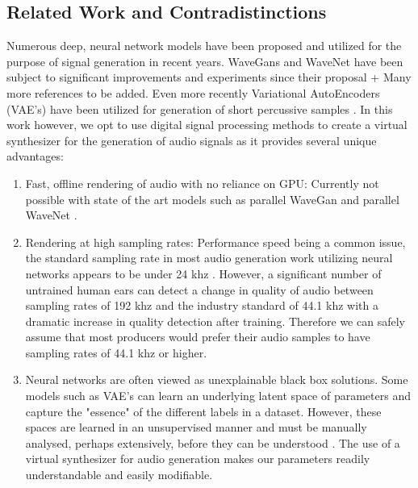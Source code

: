 \documentclass{nime-alternate} %
\begin{document}
\subsection{Related Work and Contradistinctions}
\label{related}
Numerous deep, neural network models have been proposed and utilized for the purpose of signal generation in recent years. WaveGans and WaveNet have been subject to significant improvements and experiments since their proposal \colorbox{green!=40}{\cite{nsynth2017} + Many more references to be added.} Even more recently Variational AutoEncoders (VAE's) have been utilized for generation of short percussive samples \cite{aouameur2019neural,ramires2019timbfeat}. In this work however, we opt to use digital signal processing methods to create a virtual synthesizer for the generation of audio signals as it provides several unique advantages:
\begin{enumerate}[label=\roman*]
  \item Fast, offline rendering of audio with no reliance on GPU: Currently not possible with state of the art models such as parallel WaveGan \cite{yamamoto2019parallel} and parallel WaveNet \cite{oord2017parallel}. 
  \item Rendering at high sampling rates: Performance speed being a common issue, the standard sampling rate in most audio generation work utilizing neural networks appears to be under 24 khz \cite{yamamoto2019parallel,oord2017parallel,aouameur2019neural,ramires2019timbfeat}. However, a significant number of untrained human ears can detect a change in quality of audio between sampling rates of 192 khz and the industry standard of 44.1 khz \cite{reiss2016meta} with a dramatic increase in quality detection after training. Therefore we can safely assume that most producers would prefer their audio samples to have sampling rates of 44.1 khz or higher. 
  \item Neural networks are often viewed as unexplainable black box solutions. Some models such as VAE's can learn an underlying latent space of parameters and capture the "essence" of the different labels in a dataset. However, these spaces are learned in an unsupervised manner and must be manually analysed, perhaps extensively, before they can be understood \cite{esling2018generative}. The use of a virtual synthesizer for audio generation makes our parameters readily understandable and easily modifiable. \\
  
\end{enumerate}
\end{document}
